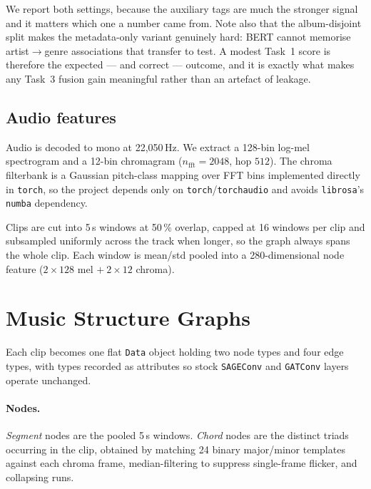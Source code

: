 \documentclass{article}
\begin{document}
We report both settings, because the auxiliary tags are much the stronger signal
and it matters which one a number came from. Note also that the album-disjoint
split makes the metadata-only variant genuinely hard: BERT cannot memorise
artist$\rightarrow$genre associations that transfer to test. A modest Task~1
score is therefore the expected --- and correct --- outcome, and it is exactly
what makes any Task~3 fusion gain meaningful rather than an artefact of leakage.

\subsection{Audio features}

Audio is decoded to mono at 22{,}050\,Hz. We extract a 128-bin log-mel
spectrogram and a 12-bin chromagram ($n_{\text{fft}} = 2048$, hop $512$). The
chroma filterbank is a Gaussian pitch-class mapping over FFT bins implemented
directly in \texttt{torch}, so the project depends only on
\texttt{torch}/\texttt{torchaudio} and avoids \texttt{librosa}'s \texttt{numba}
dependency.

Clips are cut into 5\,s windows at 50\,\% overlap, capped at 16 windows per clip
and subsampled uniformly across the track when longer, so the graph always spans
the whole clip. Each window is mean/std pooled into a 280-dimensional node
feature ($2 \times 128$ mel $+\ 2 \times 12$ chroma).

\section{Music Structure Graphs}
\label{sec:graphs}

Each clip becomes one flat \texttt{Data} object holding two node types and four
edge types, with types recorded as attributes so stock \texttt{SAGEConv} and
\texttt{GATConv} layers operate unchanged.

\paragraph{Nodes.} \textit{Segment} nodes are the pooled 5\,s windows.
\textit{Chord} nodes are the distinct triads occurring in the clip, obtained by
matching 24 binary major/minor templates against each chroma frame,
median-filtering to suppress single-frame flicker, and collapsing runs.
\end{document}
